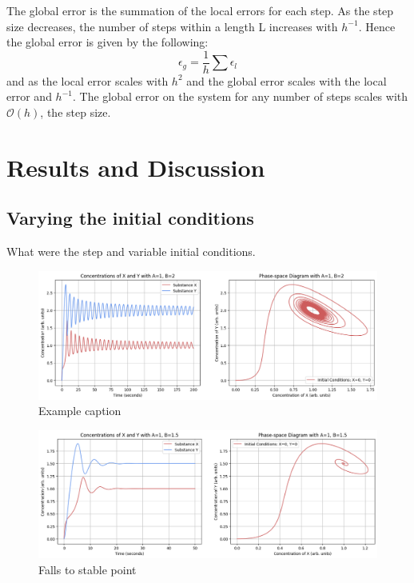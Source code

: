 \documentclass[reprint, amsmath, amssymb, aps]{revtex4-2}
\begin{document}
The global error is the summation of the local errors for each step. As the step size decreases, the number of steps within a length L increases with $h^{-1}$. Hence the global error is given by the following:
\begin{equation}
	\epsilon_g = \frac{1}{h} \sum \epsilon_l
\end{equation}and as the local error scales with $h^2$ and the global error scales with the local error and $h^{-1}$. The global error on the system for any number of steps scales with $\mathcal{O}(h)$, the step size.

\section{Results and Discussion}

\subsection{Varying the initial conditions}
What were the step and variable initial conditions.


\begin{figure}
\includegraphics[width=1.8\columnwidth]{combinedPlot.png}
\caption{\label{fig:combinedPlot}Example caption}
\end{figure}

\begin{figure}
\includegraphics[width=1.8\columnwidth]{combinedPlot_fallToStable.png}
\caption{\label{fig:combinedPlot}Falls to stable point}
\end{figure}
\end{document}
